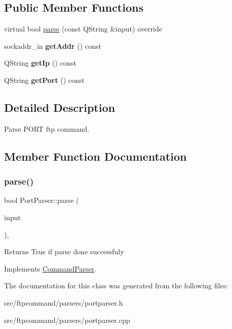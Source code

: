 \subsection*{Public Member Functions}
\begin{DoxyCompactItemize}
\item 
virtual bool \hyperlink{classPortParser_a7dbb8e4f695ed023c502a4c1f689d061}{parse} (const Q\+String \&input) override
\item 
\mbox{\label{classPortParser_a8a653486a450421f735426d2e58b7721}} 
sockaddr\+\_\+in {\bfseries get\+Addr} () const
\item 
\mbox{\label{classPortParser_a191b2f445ee9f1805a92714866f38e72}} 
Q\+String {\bfseries get\+Ip} () const
\item 
\mbox{\label{classPortParser_a3b705b28454fb7a9b0559bbb573878be}} 
Q\+String {\bfseries get\+Port} () const
\end{DoxyCompactItemize}


\subsection{Detailed Description}
Parse P\+O\+RT ftp command. 

\subsection{Member Function Documentation}
\mbox{\label{classPortParser_a7dbb8e4f695ed023c502a4c1f689d061}} 
\subsubsection{\texorpdfstring{parse()}{parse()}}
{\footnotesize\ttfamily bool Port\+Parser\+::parse (\begin{DoxyParamCaption}\item[{const Q\+String \&}]{input }\end{DoxyParamCaption})\hspace{0.3cm}{\ttfamily [override]}, {\ttfamily [virtual]}}

\begin{DoxyReturn}{Returns}
True if parse done successfuly 
\end{DoxyReturn}


Implements \hyperlink{classCommandParser_a5ed0855947a9b4500329f29b8123f2ea}{Command\+Parser}.



The documentation for this class was generated from the following files\+:\begin{DoxyCompactItemize}
\item 
src/ftpcommand/parsers/portparser.\+h\item 
src/ftpcommand/parsers/portparser.\+cpp\end{DoxyCompactItemize}
